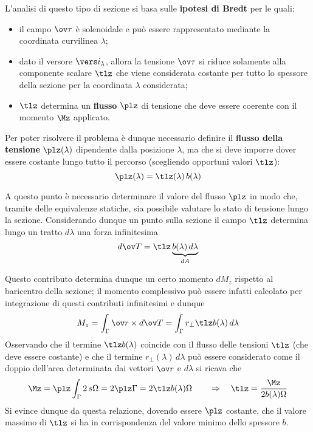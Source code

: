     		
    		\begin{concetto}
    			L'analisi di questo tipo di sezione si basa sulle \textbf{ipotesi di Bredt} per le quali:
    			\begin{itemize}
    				\item il campo $\ov \tau$ è solenoidale e può essere rappresentato mediante la coordinata curvilinea $\lambda$;
    				\item dato il versore $\vers i_\lambda$, allora la tensione $\ov \tau$ si riduce solamente alla componente scalare $\tlz$ che viene considerata costante per tutto lo spessore della sezione per la coordinata $\lambda$ considerata;
    				\item $\tlz$ determina un \textbf{flusso} $\plz$ di tensione che deve essere coerente con il momento $\Mz$ applicato.
    			\end{itemize}
    		\end{concetto}
    		
    		Per poter risolvere il problema è dunque necessario definire il \textbf{flusso della tensione} $\plz(\lambda)$ dipendente dalla posizione $\lambda$, ma che si deve imporre dover essere costante lungo tutto il percorso (scegliendo opportuni valori $\tlz$):
    		\begin{equation}
    			\plz(\lambda) = \tlz(\lambda) \, b(\lambda)
    		\end{equation}
    		
    		A questo punto è necessario determinare il valore del flusso $\plz$ in modo che, tramite delle equivalenze statiche, sia possibile valutare lo stato di tensione lungo la sezione. Considerando dunque un punto sulla sezione il campo $\tlz$ determina lungo un tratto $d\lambda$ una forza infinitesima 
    		\[ d\ov T = \tlz  \underbrace{b(\lambda)\, d\lambda}_{dA}\]
    		
    		
    		Questo contributo determina dunque un certo momento $dM_z$ rispetto al baricentro della sezione; il momento complessivo può essere infatti calcolato per integrazione di questi contributi infinitesimi e dunque
    		\[ M_z = \int_\Gamma \ov r\times d\ov T = \int_\Gamma r_\perp \tlz b(\lambda)\, d\lambda\]
    		Osservando che il termine $\tlz b(\lambda)$ coincide con il flusso delle tensioni $\tlz$ (che deve essere costante) e che il termine $r_\perp(\lambda)\, d\lambda$ può essere considerato come il doppio dell'area determinata dai vettori $\ov r$ e $d\lambda$ si ricava che
    		\begin{equation}
    			\Mz = \plz \int_\Gamma 2\, s\Omega = 2\plz \Gamma = 2\tlz b(\lambda)\Omega \qquad \Rightarrow \quad \tlz = \frac{\Mz}{2b(\lambda)\Omega}
    		\end{equation}
    		Si evince dunque da questa relazione, dovendo essere $\plz$ costante, che il valore massimo di $\tlz$ si ha in corrispondenza del valore minimo dello spessore $b$.
    		
